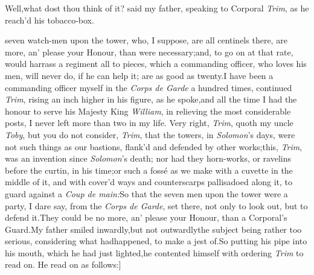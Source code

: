 \documentclass{article}
\begin{document}
\newpage
Well,\tsk what dost thou think of it? said my father,
speaking to Corporal \textit{Trim}, as he reach’d his
tobacco-box.

\noindent
{}
seven watch-men upon the tower, who, I suppose, are all centinels there,\tsk
are more,
an’ please your Honour, than were necessary;\tsk and, to go
on at that rate, would harrass a regiment all to pieces, which
a commanding officer, who loves his men, will never do, if he can
help it;\break
{}
are as good as
twenty.\tsk I have been a commanding officer myself in the
\textit{Corps de Garde} a hundred times, continued \textit{Trim},
rising an inch higher in his figure, as he spoke,\tsk and all the
time I had the honour to serve his Majesty King \textit{William}, in
relieving the most considerable posts, I never left more than two
in my life.\tsk\pb
Very right, \textit{Trim}, quoth my uncle \textit{Toby},\break
\tsk but you do not consider, \textit{Trim}, that the
towers, in \textit{Solomon}’s days, were not such things as our
bastions, flank’d and defended by other works;\tsk this,
\textit{Trim}, was an invention since \textit{Solomon}’s death;
nor had they horn-works, or ravelins before the curtin, in his
time;\tsk or such a fossé as we make with a cuvette
in the middle of it, and with cover’d ways and counterscarps
pallisadoed along it, to guard against a \textit{Coup de
main:}\tsk So that the seven men upon the tower were a party,
I dare say, from the \textit{Corps de Garde}, set there, not only to
look out, but to defend it.\tsk They could be no more, an’
please your Honour, than a Corporal’s Guard.\tsk My father
smiled inwardly,\tsk\break but not outwardly\tsk the subject being rather
too serious, considering what had\pb happened, to make a jest
of.\tsk So putting his pipe into his mouth, which he had just
lighted,\tsk he contented himself with ordering \textit{Trim} to
read on. He read on as follows:]
\end{document}

